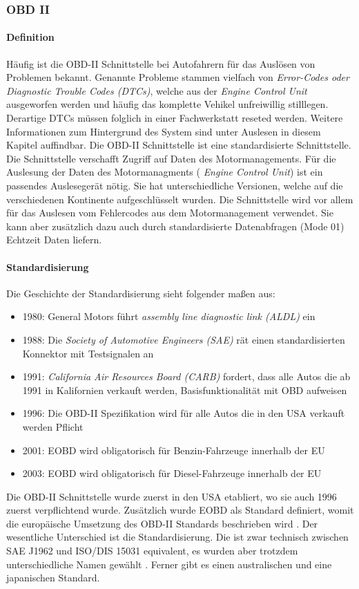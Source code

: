\subsubsection{OBD II}
\label{subsec:obd2}

\paragraph{Definition}
Häufig ist die OBD-II Schnittstelle bei Autofahrern für das Auslösen von Problemen bekannt. Genannte Probleme stammen vielfach von \textit{Error-Codes oder Diagnostic Trouble Codes (DTCs)}, welche aus der \textit{Engine Control Unit}  ausgeworfen werden und häufig das komplette Vehikel unfreiwillig stilllegen. Derartige DTCs müssen folglich in einer Fachwerkstatt reseted werden. Weitere Informationen zum Hintergrund des System sind unter Auslesen in diesem Kapitel auffindbar. 
Die OBD-II Schnittstelle ist eine standardisierte Schnittstelle. Die Schnittstelle verschafft Zugriff auf Daten des Motormanagements. Für die Auslesung der Daten des Motormanagments ( \textit{Engine Control Unit}) ist ein passendes Auslesegerät nötig. Sie hat unterschiedliche Versionen, welche auf die verschiedenen Kontinente aufgeschlüsselt wurden. Die Schnittstelle wird vor allem für das Auslesen vom Fehlercodes aus dem Motormanagement verwendet. Sie kann aber zusätzlich dazu auch durch standardisierte Datenabfragen (Mode 01) Echtzeit Daten liefern.

\paragraph{Standardisierung}
Die Geschichte der Standardisierung sieht folgender maßen aus\cite{SIMR.CH2-obd2.Timeline}:
\begin{itemize}
	\item 1980: General Motors führt \textit{assembly line diagnostic link (ALDL)} ein
	\item 1988: Die \textit{Society of Automotive Engineers (SAE)} rät einen standardisierten Konnektor mit Testsignalen an
	\item 1991: \textit{California Air Resources Board (CARB)} fordert, dass alle Autos die ab 1991 in Kalifornien verkauft werden, Basisfunktionalität mit OBD aufweisen
	\item 1996: Die OBD-II Spezifikation wird für alle Autos die in den USA verkauft werden Pflicht
	\item 2001: EOBD wird obligatorisch für Benzin-Fahrzeuge innerhalb der EU
	\item 2003: EOBD wird obligatorisch für Diesel-Fahrzeuge innerhalb der EU
\end{itemize}
Die OBD-II Schnittstelle wurde zuerst in den USA etabliert, wo sie auch 1996 zuerst verpflichtend wurde. Zusätzlich wurde EOBD als Standard definiert, womit die europäische Umsetzung des OBD-II Standards beschrieben wird \cite{SIMR.CH2-obd2.EUP-D98/69/EC}. Der wesentliche Unterschied ist die Standardisierung. Die ist zwar technisch zwischen SAE J1962 und ISO/DIS 15031 equivalent, es wurden aber trotzdem unterschiedliche Namen gewählt \cite{SIMR.CH2-obd2.SAEJ1962}. Ferner gibt es einen australischen \cite{SIMR.CH2-obd2.AU-MVSA1989} und eine japanischen Standard.


